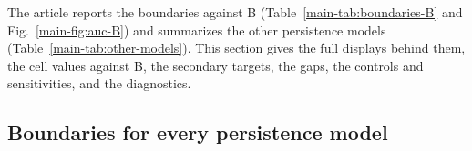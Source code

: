 \def\esmfigboundaries{fig:boundaries-by-model}%
\def\esmfigaucA{fig:auc-A}\def\esmfigaucC{fig:auc-C}\def\esmfigaucD{fig:auc-D}\def\esmfigaucE{fig:auc-E}%

The article reports the boundaries against B (Table~\ref{main-tab:boundaries-B} and Fig.~\ref{main-fig:auc-B}) and summarizes the other persistence models (Table~\ref{main-tab:other-models}). This section gives the full displays behind them, the cell values against B, the secondary targets, the gaps, the controls and sensitivities, and the diagnostics.

\subsection{Boundaries for every persistence model}\label{sec:additional-models}


